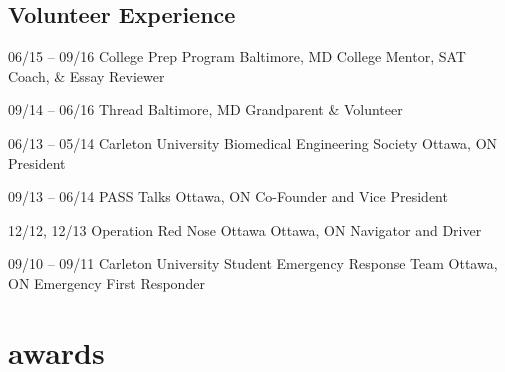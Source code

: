 \documentclass[]{friggeri-cv} %
\begin{document}
\subsection{Volunteer Experience}

\begin{entrylist}
\entry
{06/15 -- 09/16}
{College Prep Program}
{Baltimore, MD}
{College Mentor, SAT Coach, \& Essay Reviewer}

\entry
{09/14 -- 06/16}
{Thread}
{Baltimore, MD}
{Grandparent \& Volunteer}

\entry
{06/13 -- 05/14}
{Carleton University Biomedical Engineering Society}
{Ottawa, ON}
{President}

\entry
{09/13 -- 06/14}
{PASS Talks}
{Ottawa, ON}
{Co-Founder and Vice President}

\entry
{12/12, 12/13}
{Operation Red Nose Ottawa}
{Ottawa, ON}
{Navigator and Driver}

\entry
{09/10 -- 09/11}
{Carleton University Student Emergency Response Team}
{Ottawa, ON}
{Emergency First Responder}
\end{entrylist}


\section{awards}
\end{document}
